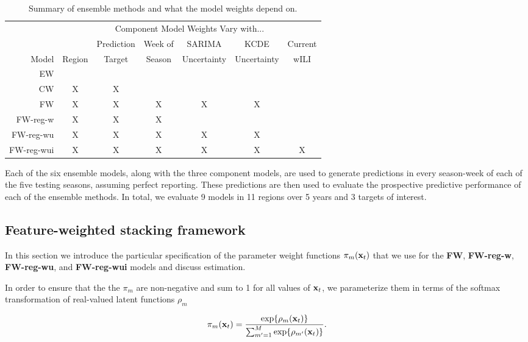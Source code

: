 \documentclass[10pt,letterpaper]{article}
\begin{document}
\begin{table}[!ht]
\centering
\caption{\label{tbl:EnsembleModelSummaryTable}Summary of ensemble methods and what the model weights depend on.}
\begin{tabular}{rcccccc}
\toprule
         & \multicolumn{6}{c}{Component Model Weights Vary with...} \\
\cline{2-7}
  &   & Prediction & Week of & SARIMA & KCDE & Current \\ 
Model & Region & Target & Season & Uncertainty & Uncertainty & wILI \\ 
  \hline
EW         &   &   &   &   &   &   \\
CW        & X & X &   &   &   &   \\
FW         & X & X & X & X & X &   \\
FW-reg-w   & X & X & X &   &   &   \\
FW-reg-wu  & X & X & X & X & X &   \\
FW-reg-wui & X & X & X & X & X & X \\
\bottomrule
\end{tabular}
\end{table}

Each of the six ensemble models, along with the three component models,
are used to generate predictions in every season-week of each of the
five testing seasons, assuming perfect reporting. These predictions are
then used to evaluate the prospective predictive performance of each of
the ensemble methods. In total, we evaluate 9 models in 11 regions over
5 years and 3 targets of interest.

\subsection{Feature-weighted stacking
framework}\label{feature-weighted-stacking-framework}

In this section we introduce the particular specification of the
parameter weight functions \(\pi_m({\bf x}_t)\) that we use for the
\textbf{FW}, \textbf{FW-reg-w}, \textbf{FW-reg-wu}, and
\textbf{FW-reg-wui} models and discuss estimation.

In order to ensure that the the \(\pi_m\) are non-negative and sum to 1
for all values of \({\bf x}_t\), we parameterize them in terms of the
softmax transformation of real-valued latent functions \(\rho_m\)

\begin{equation}
\pi_{m}({\bf x}_t) = \frac{\exp\{\rho_m({\bf x}_t)\}}{\sum_{m' = 1}^M \exp\{\rho_{m'}({\bf x}_t)\}}.  \label{eqn:PiSoftmaxRho} 
\end{equation}
\end{document}

